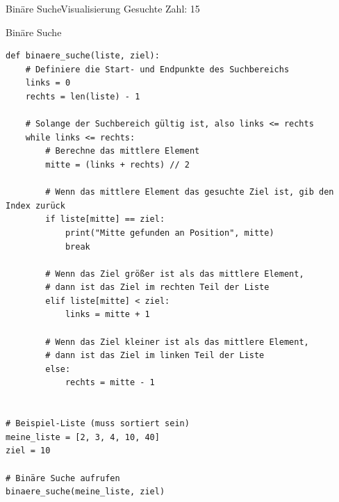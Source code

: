 \begin{frame}[fragile]{Binäre Suche}{Visualisierung}
Gesuchte Zahl: 15


% 
% 
%  
%  
\end{frame}
\begin{frame}[fragile]{Binäre Suche}
	\begin{lstlisting}[basicstyle=\tiny\ttfamily]
def binaere_suche(liste, ziel):
    # Definiere die Start- und Endpunkte des Suchbereichs
    links = 0
    rechts = len(liste) - 1

    # Solange der Suchbereich gültig ist, also links <= rechts
    while links <= rechts:
        # Berechne das mittlere Element
        mitte = (links + rechts) // 2

        # Wenn das mittlere Element das gesuchte Ziel ist, gib den Index zurück
        if liste[mitte] == ziel:
            print("Mitte gefunden an Position", mitte)
            break

        # Wenn das Ziel größer ist als das mittlere Element,
        # dann ist das Ziel im rechten Teil der Liste
        elif liste[mitte] < ziel:
            links = mitte + 1

        # Wenn das Ziel kleiner ist als das mittlere Element,
        # dann ist das Ziel im linken Teil der Liste
        else:
            rechts = mitte - 1


# Beispiel-Liste (muss sortiert sein)
meine_liste = [2, 3, 4, 10, 40]
ziel = 10

# Binäre Suche aufrufen
binaere_suche(meine_liste, ziel)
	\end{lstlisting}
\end{frame}

